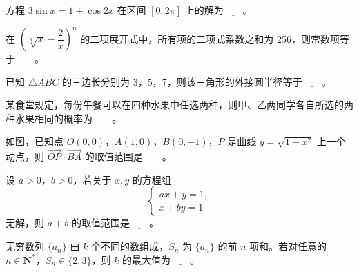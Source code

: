 \begin{question}
方程 \(3\sin x=1+\cos2x\) 在区间 \([0,2\pi]\) 上的解为\(\underline{\qquad}\)。

\end{question}
\begin{question}
在 \(\left(\sqrt[3]{x}-\dfrac2x\right)^n\) 的二项展开式中，所有项的二项式系数之和为 256，则常数项等于\(\underline{\qquad}\)。

\end{question}
\begin{question}
已知 \(\triangle ABC\) 的三边长分别为 3，5，7，则该三角形的外接圆半径等于\(\underline{\qquad}\)。

\end{question}
\begin{question}
某食堂规定，每份午餐可以在四种水果中任选两种，则甲、乙两同学各自所选的两种水果相同的概率为\(\underline{\qquad}\)。

\Needspace{0.4\textheight}
\end{question}
\begin{question}
如图，已知点 \(O(0,0)\)，\(A(1,0)\)，\(B(0,-1)\)，\(P\) 是曲线 \(y=\sqrt{1-x^2}\) 上一个动点，则 \(\overrightarrow{OP}\cdot\overrightarrow{BA}\) 的取值范围是\(\underline{\qquad}\)。
\nopagebreak[4]
\begin{center}\end{center}
\nopagebreak[4]
\end{question}
\begin{question}
设 \(a>0\)，\(b>0\)，若关于 \(x,y\) 的方程组
\nopagebreak[4]
\[
\begin{cases}
ax+y=1,\\
x+by=1
\end{cases}
\]
无解，则 \(a+b\) 的取值范围是\(\underline{\qquad}\)。

\end{question}
\begin{question}
无穷数列 \(\{a_n\}\) 由 \(k\) 个不同的数组成，\(S_n\) 为 \(\{a_n\}\) 的前 \(n\) 项和。若对任意的 \(n\in\mathbf N^*\)，\(S_n\in\{2,3\}\)，则 \(k\) 的最大值为\(\underline{\qquad}\)。

\end{question}

